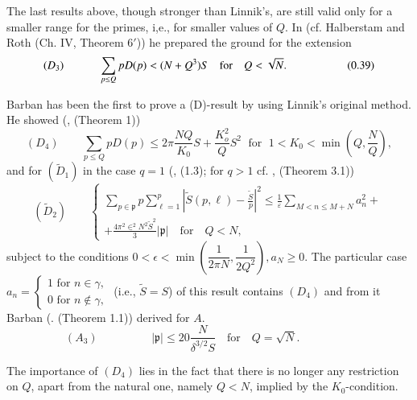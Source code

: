 The last results above, though stronger than Linnik's, are still valid
only for a smaller range for the primes, i,e., for smaller values of
$Q$. In \cite{key9} (cf. Halberstam and Roth \cite{key1} (Ch. IV,
Theorem $6'$)) he prepared the ground for the extension 
\begin{equation*}
(D_{3}) \hspace{1.1cm}  \sum_{p \leq Q} p D(p) < (N +Q^3)S \quad\text{for}\quad
  Q < \sqrt{N}. \hspace{1.2cm} \tag{0.39}\label{eq0.39}  
\end{equation*}

Barban has been the first to prove a (D)-result by using Linnik's
original method. He showed (\cite{key8}, (Theorem 1)) 
\begin{equation*}
(D_{4})\qquad \sum_{p \leq Q}pD(p) \leq 2 \pi \frac{NQ}{K_0}S+
  \frac{K^2_o}{Q} S^2\; \text{ for } \;  1<K_0 < \min (Q,
  \frac{N}{Q}),\tag{0.40}\label{eq0.40}  
\end{equation*}
and for $(\tilde{D}_1)$ in the case $q =1$ (\cite{key10}, (1.3);  for
$q>1$ cf. \cite{key10}, (Theorem 3.1)) 
\begin{equation*}
(\widetilde{D}_{2}) \qquad 
\begin{cases}
\sum_{p \in \mathfrak{p}} p \sum _{\ell =1}^p |\tilde{S}(p, \ell ) -
\frac{\tilde{S}}{p}|^2 \leq \frac{1}{\varepsilon} \sum\limits_{M<n \leq
M+N} a^2_n +\\ 
+\frac{4 \pi^2 \in^2 N^2 \tilde{S}^2} {3}|\mathfrak{p}|  \quad
\text{for}\quad  Q < N, \qquad \tag{0.41}\label{eq0.41}  
\end{cases}
\end{equation*}\pageoriginale
subject to the conditions $0< \epsilon < \min (\dfrac{1}{2 \pi
  N},\dfrac{1} {2Q^2}), a _N \ge 0$. The particular case $a_n =
\begin{cases}
1 \text{ for } n \in \gamma ,\\
0 \text{ for } n \notin \gamma,
\end{cases}$
(i.e., $\tilde {S}= S$) of this result contains $(D_4)$ and from it
Barban (\cite{key10}. (Theorem 1.1)) derived for $A$.
\begin{equation*}
(A_3) \hspace{2cm} |\mathfrak{p}| \leq  20 \frac{N}{\delta^{3/2}S}
  \quad\text{for}\quad Q = \sqrt {N}. \hspace{2cm} \tag{0.42}\label{eq0.42}  
\end{equation*}

The importance of $(D_4)$ lies in the fact that there is no longer any
restriction on $Q$, apart from the natural one, namely $Q<N$, implied
by the $K_0$-condition. 

